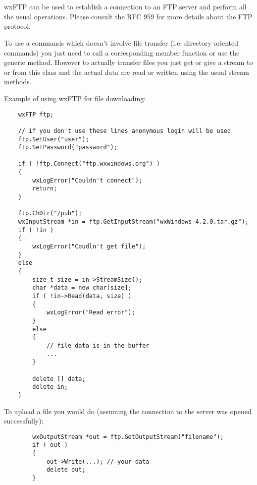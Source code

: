 
\section{}\label{wxftp}

wxFTP can be used to establish a connection to an FTP server and perform all the
usual operations. Please consult the RFC 959 for more details about the FTP
protocol.

To use a commands which doesn't involve file transfer (i.e. directory oriented
commands) you just need to call a corresponding member function or use the
generic  method. However to actually
transfer files you just get or give a stream to or from this class and the
actual data are read or written using the usual stream methods.

Example of using wxFTP for file downloading:

\begin{verbatim}
    wxFTP ftp;

    // if you don't use these lines anonymous login will be used
    ftp.SetUser("user");
    ftp.SetPassword("password");

    if ( !ftp.Connect("ftp.wxwindows.org") )
    {
        wxLogError("Couldn't connect");
        return;
    }

    ftp.ChDir("/pub");
    wxInputStream *in = ftp.GetInputStream("wxWindows-4.2.0.tar.gz");
    if ( !in )
    {
        wxLogError("Coudln't get file");
    }
    else
    {
        size_t size = in->StreamSize();
        char *data = new char[size];
        if ( !in->Read(data, size) )
        {
            wxLogError("Read error");
        }
        else
        {
            // file data is in the buffer
            ...
        }

        delete [] data;
        delete in;
    }
\end{verbatim}

To upload a file you would do (assuming the connection to the server was opened
successfully):

\begin{verbatim}
        wxOutputStream *out = ftp.GetOutputStream("filename");
        if ( out )
        {
            out->Write(...); // your data
            delete out;
        }
\end{verbatim}

